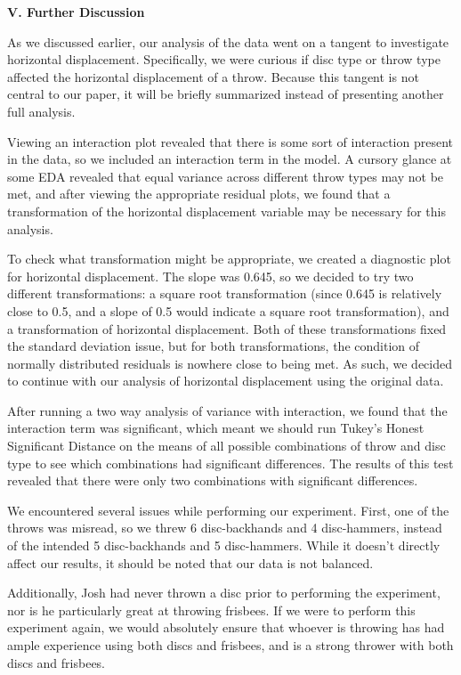 \documentclass[letter,12pt]{article}
\begin{document}
	\begin{center}
		\textbf{V. Further Discussion}\par
	\end{center}
	\justify
	As we discussed earlier, our analysis of the data went on a tangent to investigate horizontal displacement. Specifically, we were curious if disc type or throw type affected the horizontal displacement of a throw. Because this tangent is not central to our paper, it will be briefly summarized instead of presenting another full analysis.\par
	Viewing an interaction plot revealed that there is some sort of interaction present in the data, so we included an interaction term in the model. A cursory glance at some EDA revealed that equal variance across different throw types may not be met, and after viewing the appropriate residual plots, we found that a transformation of the horizontal displacement variable may be necessary for this analysis.\par
	To check what transformation might be appropriate, we created a diagnostic plot for horizontal displacement. The slope was 0.645, so we decided to try two different transformations: a square root transformation (since 0.645 is relatively close to 0.5, and a slope of 0.5 would indicate a square root transformation), and a transformation of horizontal displacement. Both of these transformations fixed the standard deviation issue, but for both transformations, the condition of normally distributed residuals is nowhere close to being met. As such, we decided to continue with our analysis of horizontal displacement using the original data. \par
	After running a two way analysis of variance with interaction, we found that the interaction term was significant, which meant we should run Tukey’s Honest Significant Distance on the means of all possible combinations of throw and disc type to see which combinations had significant differences. The results of this test revealed that there were only two combinations with significant differences.\par
	We encountered several issues while performing our experiment. First, one of the throws was misread, so we threw 6 disc-backhands and 4 disc-hammers, instead of the intended 5 disc-backhands and 5 disc-hammers. While it doesn’t directly affect our results, it should be noted that our data is not balanced.\par
	Additionally, Josh had never thrown a disc prior to performing the experiment, nor is he particularly great at throwing frisbees. If we were to perform this experiment again, we would absolutely ensure that whoever is throwing has had ample experience using both discs and frisbees, and is a strong thrower with both discs and frisbees.\par
	
\end{document}
